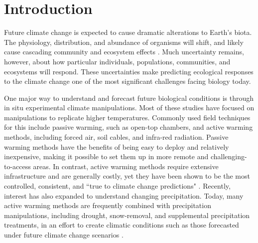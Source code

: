 \documentclass{article}
\begin{document}
\section* {Introduction}
\par Future climate change is expected to cause dramatic alterations to Earth's biota. The physiology, distribution, and abundance of organisms will shift, and likely cause cascading community and ecosystem effects \citep{thomas2004,parmesan2006,sheldon2011,urban2012}. Much uncertainty remains, however, about how particular individuals, populations, communities, and ecosystems will respond. These uncertainties make predicting ecological responses to the climate change one of the most significant challenges facing biology today.

\par One major way to understand and forecast future biological conditions is through in situ experimental climate manipulations. Most of these studies have focused on manipulations to replicate higher temperatures. Commonly used field techniques for this include passive warming, such as open-top chambers, and active warming methods, including forced air, soil cables, and infra-red radiation. Passive warming methods have the benefits of being easy to deploy and relatively inexpensive, making it possible to set them up in more remote and challenging-to-access areas. In contrast, active warming methods require extensive infrastructure and are generally costly, yet they have been shown to be the most controlled, consistent, and ``true to climate change predictions" \citep{kimball2005,kimball2008,aronson2009,wolkovich2012}. Recently, interest has also expanded to understand changing precipitation. Today, many active warming methods are frequently combined with precipitation manipulations, including drought, snow-removal, and supplemental precipitation treatments, in an effort to create climatic conditions such as those forecasted under future climate change scenarios \citep{price1998,cleland2006,sherry2007,rollinson2012}.
\end{document}
